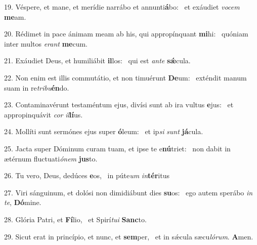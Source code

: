 19. Véspere, et mane, et merídie narrábo et annunti\textbf{á}bo: \ast\  et exáudiet \textit{vo}\textit{cem} \textbf{me}am.\

20. Rédimet in pace ánimam meam ab his, qui appropínquant \textbf{mi}hi: \ast\  quóniam inter multos \textit{e}\textit{rant} \textbf{me}cum.\

21. Exáudiet Deus, et humiliábit \textbf{il}los: \ast\  qui est \textit{an}\textit{te} \textbf{sǽ}cula.\

22. Non enim est illis commutátio, et non timuérunt \textbf{De}um: \ast\  exténdit manum suam in re\textit{tri}\textit{bu}\textbf{én}do.\

23. Contaminavérunt testaméntum ejus, divísi sunt ab ira vultus \textbf{e}jus: \ast\  et appropinquávit \textit{cor} \textit{il}\textbf{lí}us.\

24. Mollíti sunt sermónes ejus super \textbf{ó}leum: \ast\  et ip\textit{si} \textit{sunt} \textbf{já}cula.\

25. Jacta super Dóminum curam tuam, et ipse te e\textbf{nú}triet: \ast\  non dabit in ætérnum fluctuati\textit{ó}\textit{nem} \textbf{jus}to.\

26. Tu vero, Deus, dedúces \textbf{e}os, \ast\  in púte\textit{um} \textit{in}\textbf{tér}itus\

27. Viri sánguinum, et dolósi non dimidiábunt dies \textbf{su}os: \ast\  ego autem sperábo \textit{in} \textit{te}, \textbf{Dó}mine.\

28. Glória Patri, et \textbf{Fí}lio, \ast\  et Spirí\textit{tu}\textit{i} \textbf{Sanc}to.\

29. Sicut erat in princípio, et nunc, et \textbf{sem}per, \ast\  et in sǽcula sæcu\textit{ló}\textit{rum}. \textbf{A}men.\

